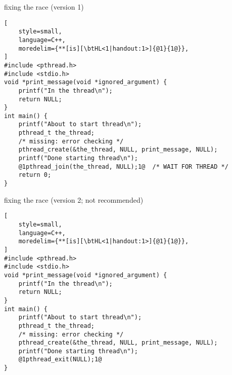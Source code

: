 


\begin{frame}[fragile,label=fixRace1]{fixing the race (version 1)}
\begin{lstlisting}[
    style=small,
    language=C++,
    moredelim={**[is][\btHL<1|handout:1>]{@1}{1@}},
]
#include <pthread.h>
#include <stdio.h>
void *print_message(void *ignored_argument) {
    printf("In the thread\n");
    return NULL;
}
int main() {
    printf("About to start thread\n");
    pthread_t the_thread;
    /* missing: error checking */
    pthread_create(&the_thread, NULL, print_message, NULL);
    printf("Done starting thread\n");
    @1pthread_join(the_thread, NULL);1@  /* WAIT FOR THREAD */
    return 0;
}
\end{lstlisting}
\end{frame}

\begin{frame}[fragile,label=fixRace2]{fixing the race (version 2; not recommended)}
\begin{lstlisting}[
    style=small,
    language=C++,
    moredelim={**[is][\btHL<1|handout:1>]{@1}{1@}},
]
#include <pthread.h>
#include <stdio.h>
void *print_message(void *ignored_argument) {
    printf("In the thread\n");
    return NULL;
}
int main() {
    printf("About to start thread\n");
    pthread_t the_thread;
    /* missing: error checking */
    pthread_create(&the_thread, NULL, print_message, NULL);
    printf("Done starting thread\n");
    @1pthread_exit(NULL);1@
}
\end{lstlisting}
\end{frame}

